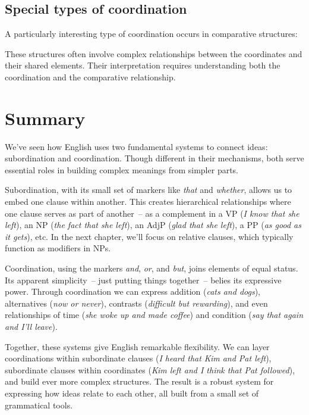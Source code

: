 \subsection{Special types of coordination}

A particularly interesting type of coordination occurs in comparative structures:

\ea \label{ex:coord-comp}
    \z
\z

These structures often involve complex relationships between the coordinates and their shared elements. Their interpretation requires understanding both the coordination and the comparative relationship.


\section{Summary}

We've seen how English uses two fundamental systems to connect ideas: subordination and coordination. Though different in their mechanisms, both serve essential roles in building complex meanings from simpler parts.

Subordination, with its small set of markers like \textit{that} and \textit{whether}, allows us to embed one clause within another. This creates hierarchical relationships where one clause serves as part of another~-- as a complement in a VP (\textit{I know that she left}), an NP (\textit{the fact that she left}), an AdjP (\textit{glad that she left}), a PP (\textit{as good as it gets}), etc. In the next chapter, we'll focus on relative clauses, which typically function as modifiers in NPs.

Coordination, using the markers \textit{and}, \textit{or}, and \textit{but}, joins elements of equal status. Its apparent simplicity~-- just putting things together~-- belies its expressive power. Through coordination we can express addition (\textit{cats and dogs}), alternatives (\textit{now or never}), contrasts (\textit{difficult but rewarding}), and even relationships of time (\textit{she woke up and made coffee}) and condition (\textit{say that again and I'll leave}).

Together, these systems give English remarkable flexibility. We can layer coordinations within subordinate clauses (\textit{I heard that Kim and Pat left}), subordinate clauses within coordinates (\textit{Kim left and I think that Pat followed}), and build ever more complex structures. The result is a robust system for expressing how ideas relate to each other, all built from a small set of grammatical tools.
